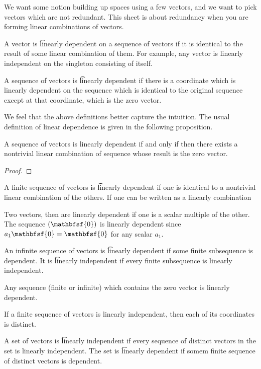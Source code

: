 

We want some notion building up spaces using a few vectors, and we want to pick vectors which are not redundant.
This sheet is about redundancy when you are forming linear combinations of vectors.



A vector is \t{linearly dependent} on a sequence of vectors if it is identical to the result of some linear combination of them.
For example, any vector is linearly independent on the singleton consisting of itself.

A sequence of vectors is \t{linearly dependent} if there is a coordinate which is linearly dependent on the sequence which is identical to the original sequence except at that coordinate, which is the zero vector.

We feel that the above definitions better capture the intuition.
The usual definition of linear dependence is given in the following proposition.
\begin{prop}
  A sequence of vectors is linearly dependent if and only if then there exists a nontrivial linear combination of sequence whose result is the zero vector.
  \begin{proof}

  \end{proof}

\end{prop}
A finite sequence of vectors is \t{linearly dependent} if one is identical to a nontrivial linear combination of the others.
If one can be written as a linearly combination

Two vectors, then are linearly dependent if one is a scalar multiple of the other.
The sequence $(\mathbfsf{0})$ is linearly dependent since $a_1 \mathbfsf{0} = \mathbfsf{0}$ for any scalar $a_1$.

An infinite sequence of vectors is \t{linearly dependent} if some finite subsequence is dependent.
It is \t{linearly independent} if every finite subsequence is linearly independent.

Any sequence (finite or infinite) which contains the zero vector is linearly dependent.

If a finite sequence of vectors is linearly independent, then each of its coordinates is distinct.

A set of vectors is \t{linearly independent} if every sequence of distinct vectors in the set is linearly independent.
The set is \t{linearly dependent} if somem finite sequence of distinct vectors is dependent.
